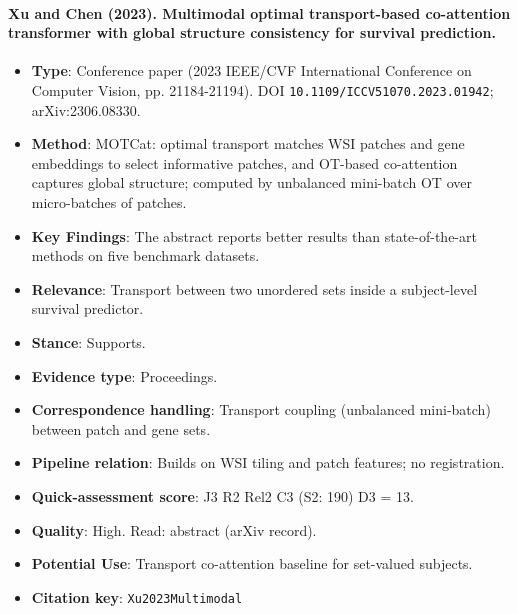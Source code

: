 \documentclass[journal,onecolumn]{IEEEtran}
\begin{document}
\paragraph{Xu and Chen (2023). Multimodal optimal transport-based co-attention transformer with global structure consistency for survival prediction.~\cite{Xu2023Multimodal}}\mbox{}

\begin{itemize}

\item{} \textbf{Type}: Conference paper (2023 IEEE/CVF International Conference on Computer Vision, pp. 21184-21194). DOI \nolinkurl{10.1109/ICCV51070.2023.01942}; arXiv:2306.08330.

\item{} \textbf{Method}: MOTCat: optimal transport matches WSI patches and gene embeddings to select informative patches, and OT-based co-attention captures global structure; computed by unbalanced mini-batch OT over micro-batches of patches.

\item{} \textbf{Key Findings}: The abstract reports better results than state-of-the-art methods on five benchmark datasets.

\item{} \textbf{Relevance}: Transport between two unordered sets inside a subject-level survival predictor.

\item{} \textbf{Stance}: Supports.

\item{} \textbf{Evidence type}: Proceedings.

\item{} \textbf{Correspondence handling}: Transport coupling (unbalanced mini-batch) between patch and gene sets.

\item{} \textbf{Pipeline relation}: Builds on WSI tiling and patch features; no registration.

\item{} \textbf{Quick-assessment score}: J3 R2 Rel2 C3 (S2: 190) D3 = 13.

\item{} \textbf{Quality}: High. Read: abstract (arXiv record).

\item{} \textbf{Potential Use}: Transport co-attention baseline for set-valued subjects.

\item{} \textbf{Citation key}: \texttt{Xu2023Multimodal}

\end{itemize}
\end{document}
